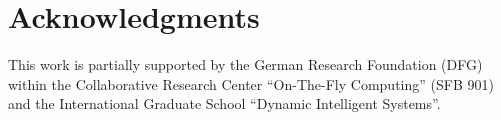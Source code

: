 \documentclass{sig-alternate-per}
\begin{document}
\section{Acknowledgments}
This work is partially supported by the German Research Foundation (DFG) within
the Collaborative Research Center “On-The-Fly Computing” (SFB 901) and the 
International Graduate School ``Dynamic Intelligent Systems''.
\\
\\

  
\end{document}
